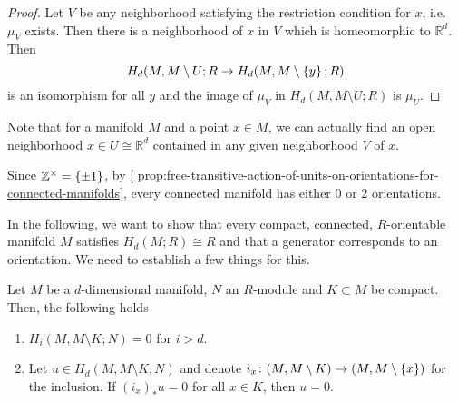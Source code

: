 \begin{proof}
  Let $V$ be any neighborhood satisfying
  the restriction condition for $x$, i.e.~$\mu_V$ exists.
  Then there is a neighborhood of $x$ in $V$ which is homeomorphic
  to $\mathbb{R}^d$.
  Then
  \[
    H_d(M, M\setminus U;R \to H_d(M, M\setminus \left\{  y  \right\} ;R)
  \]
  is an isomorphism for all $y$ and the image of  $\mu_V$
  in  $H_d(M, M\setminus U;R)$ is $\mu_U$.
\end{proof}

\begin{oral}
  Note that for a manifold $M$ and a point  $x\in M$,
  we can actually find an open neighborhood $x\in U \cong \mathbb{R}^d$
  contained in any given neighborhood $V$ of  $x$.
\end{oral}

\begin{example}
  \label{ex:connected-manifold-has-zero-or-two-orientations}
  Since $\mathbb{Z}^{\times} = \left\{  \pm 1  \right\} $, by
  \autoref{ prop:free-transitive-action-of-units-on-orientations-for-connected-manifolds},
  every connected manifold has either $0$ or $2$ orientations.
\end{example}

In the following,
we want to show that every compact, connected,
$R$-orientable manifold $M$ satisfies
$H_d(M;R) \cong R$ and that a generator corresponds
to an orientation.
We need to establish a few things for this.

\begin{lemma}
  \label{lm:top-homology-of-manifold-relative-to-cocompact-subset}
  Let $M$ be a $d$-dimensional manifold, $N$ an  $R$-module
  and  $K\subset M$ be compact.
  Then, the following holds
  \begin{enumerate}[h]
    \item $H_i(M, M\setminus K ; N) = 0$ for $i>d$.
    \item Let $u\in H_d(M, M \setminus K;N)$ and denote
      $i_x\colon (M, M \setminus K) \to  (M, M \setminus \left\{  x  \right\} )$
      for the inclusion.
      If $(i_x)_* u = 0$ for all  $x\in K$, then $u=0$.
  \end{enumerate}
\end{lemma}

